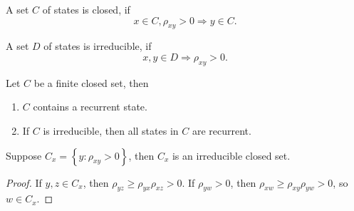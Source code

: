 \begin{definition}
    A set $C$ of states is closed, if
    \begin{equation}
        x\in C,\rho_{xy}>0\Rightarrow y\in C.
    \end{equation}
\end{definition}

\begin{definition}
    A set $D$ of states is irreducible, if
    \begin{equation}
        x,y\in D\Rightarrow\rho_{xy}>0.
    \end{equation}
\end{definition}

\begin{theorem}
    Let $C$ be a finite closed set, then
    \begin{enumerate}
        \item $C$ contains a recurrent state.
        \item If $C$ is irreducible, then all states in $C$ are recurrent.
    \end{enumerate}
\end{theorem}

\begin{theorem}
    Suppose $C_{x}=\left\{y:\rho_{x y}>0\right\}$, then $C_{x}$ is an irreducible closed set.
\end{theorem}

\begin{proof}
    If $y,z\in C_{x}$, then $\rho_{yz}\geq\rho_{yx}\rho_{xz}>0$. If $\rho_{yw}>0$, then $\rho_{xw}\geq\rho_{xy}\rho_{yw}>0$, so $w\in C_{x}$.
\end{proof}

